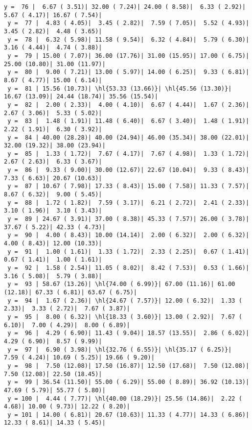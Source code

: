 \documentclass[10pt]{article}
\newcommand{\hl}[1]{\textcolor{blue}{#1}}
\begin{document}
\begin{Verbatim}[fontsize=\small, commandchars=\\\{\}]
 y =  76 |  6.67 ( 3.51)| 32.00 ( 7.24)| 24.00 ( 8.58)|  6.33 ( 2.92)|  5.67 ( 4.17)| 16.67 ( 7.54)|
 y =  77 |  4.83 ( 4.05)|  3.45 ( 2.82)|  7.59 ( 7.05)|  5.52 ( 4.93)|  3.45 ( 2.82)|  4.48 ( 3.65)|
 y =  78 |  6.32 ( 5.98)| 11.58 ( 9.54)|  6.32 ( 4.84)|  5.79 ( 6.30)|  3.16 ( 4.44)|  4.74 ( 3.88)|
 y =  79 | 15.00 ( 7.07)| 36.00 (17.76)| 31.00 (15.95)| 17.00 ( 6.75)| 25.00 (10.80)| 31.00 (11.97)|
 y =  80 |  9.00 ( 7.21)| 13.00 ( 5.97)| 14.00 ( 6.25)|  9.33 ( 6.81)|  8.67 ( 4.77)| 15.00 ( 6.14)|
 y =  81 | 15.56 (10.73)| \hl{53.33 (13.66)}| \hl{45.56 (13.30)}| 16.67 (13.09)| 24.44 (18.74)| 35.56 (15.54)|
 y =  82 |  2.00 ( 2.33)|  4.00 ( 4.10)|  6.67 ( 4.44)|  1.67 ( 2.36)|  2.67 ( 3.06)|  5.33 ( 5.02)|
 y =  83 |  1.48 ( 1.91)| 11.48 ( 6.40)|  6.67 ( 3.40)|  1.48 ( 1.91)|  2.22 ( 1.91)|  6.30 ( 3.92)|
 y =  84 | 40.00 (28.28)| 40.00 (24.94)| 46.00 (35.34)| 38.00 (22.01)| 32.00 (19.32)| 38.00 (23.94)|
 y =  85 |  1.33 ( 1.72)|  7.67 ( 4.17)|  7.67 ( 4.98)|  1.33 ( 1.72)|  2.67 ( 2.63)|  6.33 ( 3.67)|
 y =  86 |  9.33 ( 9.00)| 30.00 (12.67)| 22.67 (10.04)|  9.33 ( 8.43)|  7.33 ( 6.63)| 20.67 (10.63)|
 y =  87 | 10.67 ( 7.98)| 17.33 ( 8.43)| 15.00 ( 7.58)| 11.33 ( 7.57)|  8.67 ( 6.32)|  9.00 ( 5.45)|
 y =  88 |  1.72 ( 1.82)|  7.59 ( 3.17)|  6.21 ( 2.72)|  2.41 ( 2.33)|  3.10 ( 1.96)|  3.10 ( 3.43)|
 y =  89 | 24.67 ( 3.91)| 37.00 ( 8.38)| 45.33 ( 7.57)| 26.00 ( 3.78)| 37.67 ( 5.22)| 42.33 ( 4.73)|
 y =  90 |  4.00 ( 8.43)| 10.00 (14.14)|  2.00 ( 6.32)|  2.00 ( 6.32)|  4.00 ( 8.43)| 12.00 (10.33)|
 y =  91 |  1.00 ( 1.61)|  1.33 ( 1.72)|  2.33 ( 2.25)|  0.67 ( 1.41)|  0.67 ( 1.41)|  1.00 ( 1.61)|
 y =  92 |  1.58 ( 2.54)| 11.05 ( 8.02)|  8.42 ( 7.53)|  0.53 ( 1.66)|  3.16 ( 5.08)|  5.79 ( 3.88)|
 y =  93 | 58.67 (13.26)| \hl{74.00 ( 6.99)}| 67.00 (11.16)| 61.00 (12.18)| 67.33 ( 6.81)| 63.67 ( 6.75)|
 y =  94 |  1.67 ( 2.36)| \hl{24.67 ( 7.57)}| 12.00 ( 6.32)|  1.33 ( 2.33)|  3.33 ( 2.72)|  7.67 ( 3.87)|
 y =  95 |  8.00 ( 6.32)| \hl{18.33 ( 3.60)}| 13.00 ( 2.92)|  7.67 ( 6.10)|  7.00 ( 4.29)|  8.00 ( 6.89)|
 y =  96 |  4.29 ( 6.90)| 11.43 ( 9.04)| 18.57 (13.55)|  2.86 ( 6.02)|  4.29 ( 6.90)|  8.57 ( 9.99)|
 y =  97 |  6.90 ( 3.98)| \hl{32.76 ( 6.55)}| \hl{35.17 ( 6.25)}|  7.59 ( 4.24)| 10.69 ( 5.25)| 19.66 ( 9.20)|
 y =  98 |  7.50 (12.08)| 17.50 (16.87)| 12.50 (17.68)|  7.50 (12.08)|  7.50 (12.08)| 22.50 (18.45)|
 y =  99 | 36.54 (11.50)| 55.00 ( 6.29)| 55.00 ( 8.89)| 36.92 (10.13)| 47.69 ( 5.79)| 55.77 ( 5.80)|
 y = 100 |  4.44 ( 7.77)| \hl{40.00 (18.29)}| 25.56 (14.86)|  2.22 ( 4.68)| 10.00 ( 9.73)| 12.22 ( 8.20)|
 y = 101 | 14.00 ( 6.81)| 20.67 (10.63)| 11.33 ( 4.77)| 14.33 ( 6.86)| 12.33 ( 8.61)| 14.33 ( 5.45)|
\end{Verbatim}
\end{document}
